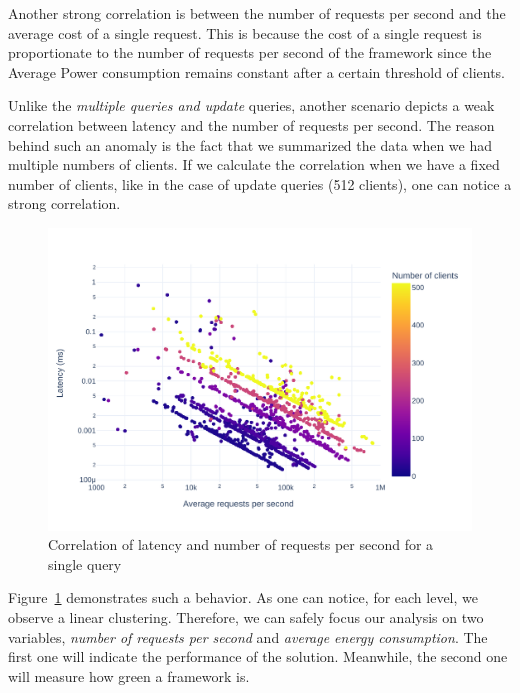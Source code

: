 Another strong correlation is between the number of requests per second and the average cost of a single request.
This is because the cost of a single request is proportionate to the number of requests per second of the framework since the Average Power consumption remains constant after a certain threshold of clients.

Unlike the \emph{multiple queries and update} queries, another scenario depicts a weak correlation between latency and the number of requests per second.
The reason behind such an anomaly is the fact that we summarized the data when we had multiple numbers of clients.
If we calculate the correlation when we have a fixed number of clients, like in the case of update queries (512 clients), one can notice a strong correlation.

\begin{figure}[bht]
    \centering
    \includegraphics[width=.9\columnwidth ]{imgs/scatter_db_latency_rps}
    \caption{Correlation of latency and number of requests per second for a single query}
    \label{fig:scatter_db}
\end{figure}

Figure~\ref{fig:scatter_db} demonstrates such a behavior.
As one can notice, for each level, we observe a linear clustering.
Therefore, we can safely focus our analysis on two variables, \emph{number of requests per second} and \emph{average energy consumption}.
The first one will indicate the performance of the solution. Meanwhile, the second one will measure how green a framework is.





